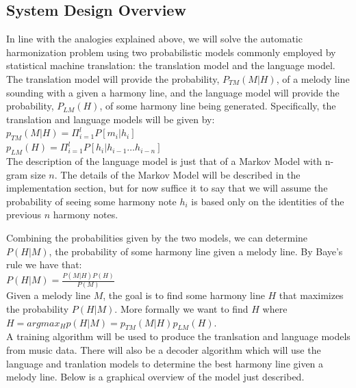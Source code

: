 \documentclass{sig-alternate}
\begin{document}
\subsection{System Design Overview}

In line with the analogies explained above, we will solve the automatic harmonization problem using two probabilistic models commonly employed by statistical machine translation: the translation model and the language model. The translation model will provide the probability, $P_{TM}(M | H)$, of a melody line sounding with a given a harmony line, and the language model will provide the probability, $P_{LM}(H)$, of some harmony line being generated. Specifically, the translation and language models will be given by: \\

$p_{TM}(M | H) = \Pi_{i = 1}^{l} P[m_{i} | h_{i}]$\\

$p_{LM}(H) = \Pi_{i = 1}^{l} P[h_{i} | h_{i - 1} \ldots h_{i - n}]$\\

The description of the language model is just that of a Markov Model with n-gram size $n$. The details of the Markov Model will be described in the implementation section, but for now suffice it to say that we will assume the probability of seeing some harmony note $h_{i}$ is based only on the identities of the previous $n$ harmony notes. 

Combining the probabilities given by the two models, we can determine $P(H | M)$, the probability of some harmony line given a melody line. By Baye's rule we have that: \\

$P(H | M) = \frac{P(M | H)P(H)}{P(M)}$\\

Given a melody line $M$, the goal is to find some harmony line $H$ that maximizes the probability $P(H | M)$. More formally we want to find $H$ where\\

$H = argmax_{H}p(H | M) = p_{TM}(M | H)p_{LM}(H)$.\\

A training algorithm will be used to produce the tranlsation and language models from music data. There will also be a decoder
algorithm which will use the language and tranlation models to determine the best harmony line given a melody line. Below is a graphical overview of the model just described.\\
\end{document}
